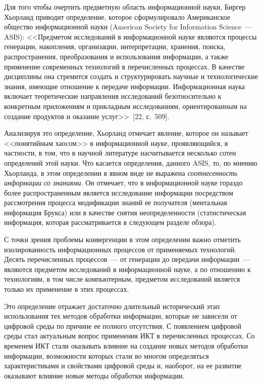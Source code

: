 \begin{multicols}{2}
      Для того чтобы очертить предметную область информационной науки, Биргер Хьорланд
при\-водит определение, которое сформулировало Американское общество информационной
науки
(American Society for Information Science~--- ASIS): <<Предметом исследований в
информационной науке являются процессы генерации, накопления, организации,
интерпретации, хранения, поиска, распространения, преобразования и использования
информации, а также применение современных технологий в перечисленных процессах. В
качестве дисциплины она стремится создать и структурировать научные и технологические
знания, имеющие отношение к передаче информации. Информационная наука включает
теоретические направления исследований безотносительно к конкретным приложениям и
прикладным исследованиям, ориентированным на создание продуктов и оказание
услуг>>~[22, с.~509].

      Анализируя это определение, Хьорланд отмечает явление, которое он называет
<<понятийным хаосом>> в информационной науке, проявляющийся, в частности, в том, что в
научной литературе насчитывается несколько сотен определений этой науки. Что касается
определения, данного ASIS, то, по мнению Хьорланда, в этом определении в явном виде не
выражена \textit{соотнесенность информации со знаниями}. Он отмечает, что в
информационной науке гораздо более распространенным является исследование информации
посредством рассмотрения процесса модификации знаний ее получателя (ментальная
информация Брукса) или в качестве снятия неопределенности (статистическая информация,
которая рассматривается в следующем разделе обзора).

      С точки зрения проблемы конвергенции в этом определении важно отметить
изо\-ли\-ро\-ванность инфор\-ма\-ци\-он\-ных процессов от применяемых технологий. Десять
перечисленных процессов~--- от генерации до передачи информации~--- являются предметом
исследований в информационной науке, а по отношению к технологиям, в том числе
компьютерным, предметом исследований является только их применение в этих процессах.

      Это определение отражает достаточно длительный исторический этап использования тех
методов обработки информации, которые не зависели от циф\-ро\-вой среды по причине ее
полного отсутствия. С появлением цифровой среды стал актуальным вопрос применения ИКТ в
перечисленных процессах. Со временем ИКТ стали оказывать влияние на создание новых
методов обработки информации, возможности которых стали во многом определяться
характеристиками и свойствами цифровой среды и, наоборот, на ее развитие оказывают
влияние новые методы обработки информации.


\end{multicols}
